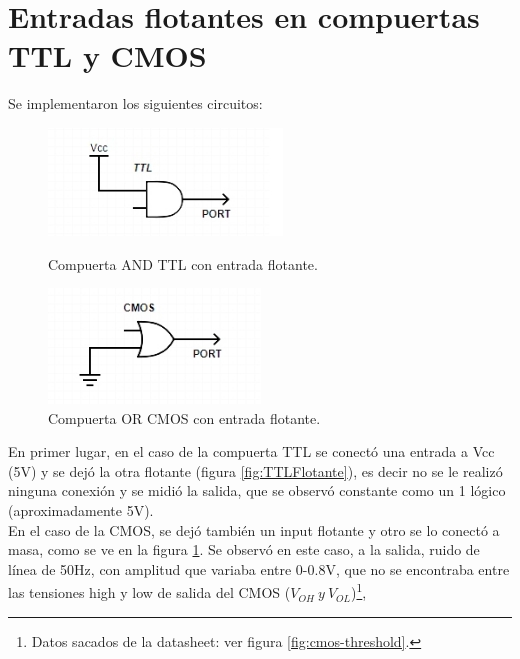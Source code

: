 \section{Entradas flotantes en compuertas TTL y CMOS}
\vspace{5mm}
Se implementaron los siguientes circuitos:

\begin{figure}[H]
    \begin{minipage}{.49\linewidth}
        \centering
        \includegraphics[width=.6\linewidth]{./TTLFlotante.jpg}
        \caption{Compuerta AND TTL con entrada flotante.}
        \label{fig:TTLFlotante}
    \end{minipage}
    \begin{minipage}{.5\linewidth}
        \centering
        \includegraphics[width=.5\linewidth]{./CMOSFlotante.jpg}
        \caption{Compuerta OR CMOS con entrada flotante.}
        \label{fig:CMOSFlotante}
    \end{minipage}
\end{figure}
\vspace{5mm}
En primer lugar, en el caso de la compuerta TTL se conectó una entrada a Vcc (5V) y se dejó la otra flotante (figura \ref{fig:TTLFlotante}),
 es decir no se le realizó ninguna conexión y se midió la salida, que se observó constante como un 1 lógico (aproximadamente 5V). \\
En el caso de la CMOS, se dejó también un input flotante y otro se lo conectó a masa, como se ve en la figura \ref{fig:CMOSFlotante}. 
Se observó en este caso, a la salida, ruido de línea de 50Hz, con amplitud que variaba entre 0-0.8V, que no se encontraba entre las tensiones high y low de salida 
del CMOS ($V_{OH}~y~V_{OL}$)\footnote{Datos sacados de la datasheet: ver figura \ref{fig:cmos-threshold}.},
